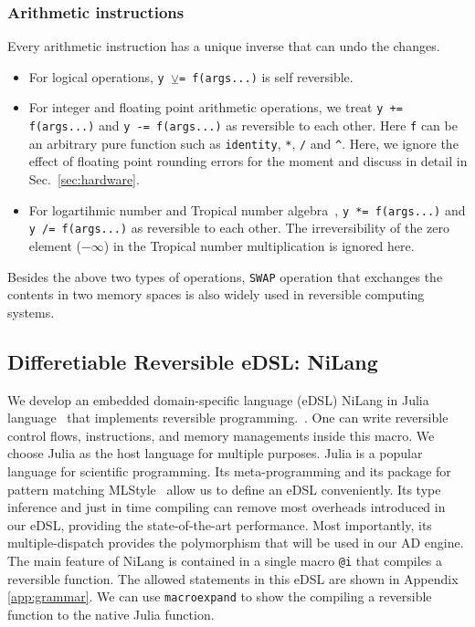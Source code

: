 \documentclass{article}
\newcommand{\<}{\langle}
\renewcommand{\>}{\rangle}
\newcommand{\Sec}[1]{Sec.~\ref{#1}}
\newcommand{\App}[1]{Appendix \ref{#1}}
\theoremstyle{definition}\newtheorem{definition}{\textit{Definition}}
\begin{document}
\subsubsection{Arithmetic instructions}
Every arithmetic instruction has a unique inverse that can undo the changes.
\begin{itemize}
    \item For logical operations, \texttt{y $\veebar$= f(args...)} is self reversible.
    \item For integer and floating point arithmetic operations, we treat \texttt{y += f(args...)} and \texttt{y -= f(args...)} as reversible to each other. Here \texttt{f} can be an arbitrary pure function such as \texttt{identity}, \texttt{*}, \texttt{/} and \texttt{\^}. Here, we ignore the effect of floating point rounding errors for the moment and discuss in detail in \Sec{sec:hardware}.
    \item For logartihmic number and Tropical number algebra~\cite{Speyer2009}, \texttt{y *= f(args...)} and \texttt{y /= f(args...)} as reversible to each other. The irreversibility of the zero element ($-\infty$) in the Tropical number multiplication is ignored here.
\end{itemize}
Besides the above two types of operations, \texttt{SWAP} operation that exchanges the contents in two memory spaces is also widely used in reversible computing systems.

\subsection{Differetiable Reversible eDSL: NiLang}
    We develop an embedded domain-specific language (eDSL) NiLang in Julia language~\cite{Bezanson2012,Bezanson2017} that implements reversible programming.~\cite{Perumalla2013,Frank2017}. One can write reversible control flows, instructions, and memory managements inside this macro.
We choose Julia as the host language for multiple purposes. Julia is a popular language for scientific programming. Its meta-programming and its package for pattern matching MLStyle~\cite{MLStyle} allow us to define an eDSL conveniently. Its type inference and just in time compiling can remove most overheads introduced in our eDSL, providing the state-of-the-art performance. Most importantly, its multiple-dispatch provides the polymorphism that will be used in our AD engine.
The main feature of NiLang is contained in a single macro \texttt{@i} that compiles a reversible function.
The allowed statements in this eDSL are shown in \App{app:grammar}.
We can use \texttt{macroexpand} to show the compiling a reversible function to the native Julia function.
\end{document}
